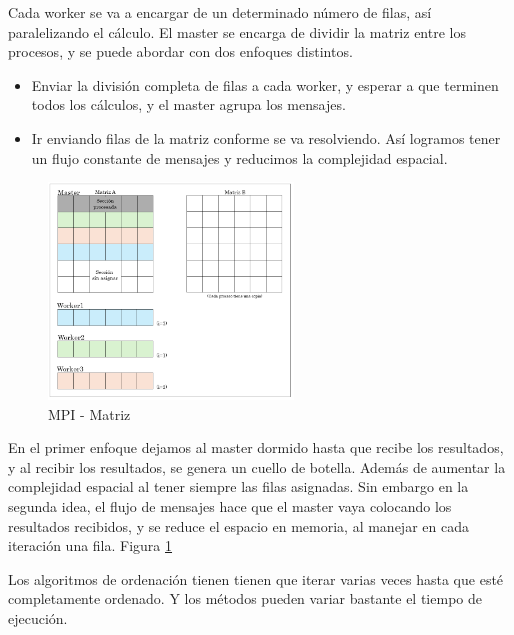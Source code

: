 Cada worker se va a encargar de un determinado número de filas, así paralelizando el cálculo. El master se encarga de dividir la matriz entre los procesos, y se puede abordar con dos enfoques distintos.
\begin{itemize}
	\item Enviar la división completa de filas a cada worker, y esperar a que terminen todos los cálculos, y el master agrupa los mensajes. 
	\item Ir enviando filas de la matriz conforme se va resolviendo. Así logramos tener un flujo constante de mensajes y reducimos la complejidad espacial.
\end{itemize}



\begin{figure}[!h]
	\centering
	\includegraphics[width=0.58\textwidth]{images/chapter_3/matriz_mpi}
	\caption{MPI - Matriz}
	\label{fig:matrizmpi}
\end{figure}

En el primer enfoque dejamos al master dormido hasta que recibe los resultados, y al recibir los resultados, se genera un cuello de botella. Además de aumentar la complejidad espacial al tener siempre las filas asignadas. Sin embargo en la segunda idea, el flujo de mensajes hace que el master vaya colocando los resultados recibidos, y se reduce el espacio en memoria, al manejar en cada iteración una fila. Figura \ref{fig:matrizmpi}


\vspace*{0.2cm}

Los algoritmos de ordenación tienen tienen que iterar varias veces hasta que esté completamente ordenado. Y los métodos pueden variar bastante el tiempo de ejecución.


